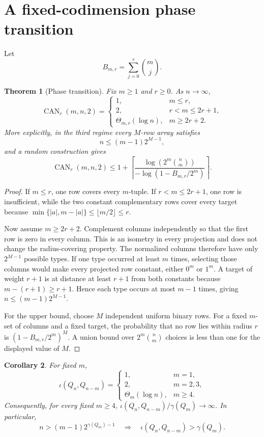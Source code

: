 \documentclass[11pt]{article}
\newtheorem{theorem}{Theorem}[section]
\newtheorem{corollary}[theorem]{Corollary}
\theoremstyle{definition}
\theoremstyle{remark}
\newcommand{\CAN}{\operatorname{CAN}}
\begin{document}
\section{A fixed-codimension phase transition}

Let
\[
  B_{m,r}=\sum_{j=0}^r {m\choose j}.
\]

\begin{theorem}[Phase transition]\label{thm:phase}
Fix $m\ge1$ and $r\ge0$.  As $n\to\infty$,
\[
\CAN_r(m,n,2)=
\begin{cases}
1, & m\le r,\\
2, & r<m\le 2r+1,\\
\Theta_{m,r}(\log n), & m\ge 2r+2.
\end{cases}
\]
More explicitly, in the third regime every $M$-row array satisfies
\[
  n\le (m-1)2^{M-1},
\]
and a random construction gives
\[
 \CAN_r(m,n,2)
 \le 1+\left\lceil
 \frac{\log\!\left(2^m{n\choose m}\right)}
 {-\log\!\left(1-B_{m,r}/2^m\right)}
 \right\rceil.
\]
\end{theorem}

\begin{proof}
If $m\le r$, one row covers every $m$-tuple.  If $r<m\le2r+1$, one row is
insufficient, while the two constant complementary rows cover every target
because $\min\{|a|,m-|a|\}\le\lfloor m/2\rfloor\le r$.

Now assume $m\ge2r+2$.  Complement columns independently so that the first row
is zero in every column.  This is an isometry in every projection and does not
change the radius-covering property.  The normalized columns therefore have
only $2^{M-1}$ possible types.  If one type occurred at least $m$ times,
selecting those columns would make every projected row constant, either
$0^m$ or $1^m$.  A target of weight $r+1$ is at distance at least $r+1$ from
both constants because $m-(r+1)\ge r+1$.  Hence each type occurs at most
$m-1$ times, giving $n\le(m-1)2^{M-1}$.

For the upper bound, choose $M$ independent uniform binary rows.  For a fixed
$m$-set of columns and a fixed target, the probability that no row lies within
radius $r$ is $(1-B_{m,r}/2^m)^M$.  A union bound over
$2^m{n\choose m}$ choices is less than one for the displayed value of $M$.
\end{proof}

\begin{corollary}\label{cor:binary-phase}
For fixed $m$,
\[
\iota(Q_n,Q_{n-m})=
\begin{cases}
1,&m=1,\\
2,&m=2,3,\\
\Theta_m(\log n),&m\ge4.
\end{cases}
\]
Consequently, for every fixed $m\ge4$,
$\iota(Q_n,Q_{n-m})/\gamma(Q_m)\to\infty$.  In particular,
\[
 n>(m-1)2^{\gamma(Q_m)-1}
 \quad\Longrightarrow\quad
 \iota(Q_n,Q_{n-m})>\gamma(Q_m).
\]
\end{corollary}
\end{document}
